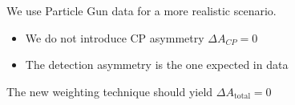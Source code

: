 \documentclass{beamer}
\begin{document}
\begin{frame}
      \frametitle{\insertsubsectionhead}
      \rightarrow We use Particle Gun data for a more realistic scenario.
      \begin{itemize}
            \item We do not introduce CP asymmetry $\Delta A_{CP} = 0$
            \item The detection asymmetry is the one expected in data
      \end{itemize}
      \begin{figure}
            \centering
      \end{figure}
      \rightarrow The new weighting technique should yield $\Delta A_\text{total} = 0$
\end{frame}
\end{document}
